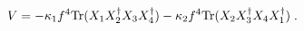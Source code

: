 \begin{equation}
\label{eq:plaquette}
V = - \kappa_1 f^4 {\rm Tr}(X_1 X_2^\dagger X_3 X_4^\dagger) -
\kappa_2 f^4 {\rm Tr}(X_2 X_3^\dagger X_4 X_1^\dagger) \;.  \end{equation}

